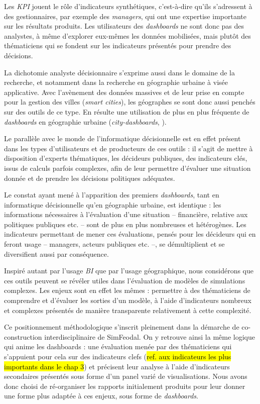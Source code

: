 	Les \textit{KPI} jouent le rôle d'indicateurs synthétiques, c'est-à-dire qu'ils s'adressent à des gestionnaires, par exemple des \textit{managers}, qui ont une expertise importante sur les résultats produits.
	Les utilisateurs des \textit{dashboards} ne sont donc pas des analystes, à même d'explorer eux-mêmes les données mobilisées, mais plutôt des thématiciens qui se fondent sur les indicateurs présentés pour prendre des décisions.

	La dichotomie \og analyste décisionnaire\fg{} s'exprime aussi dans le domaine de la recherche, et notamment dans la recherche en géographie urbaine à visée applicative.
	Avec l'avènement des données massives et de leur prise en compte pour la gestion des villes (\textit{smart cities}), les géographes se sont donc aussi penchés sur des outils de ce type.
	En résulte une utilisation de plus en plus fréquente de \textit{dashboards} en géographie urbaine (\og \textit{city-dashboards}\fg{}, \cite{roumpani_creating_2013, kitchin_knowing_2015, batty_perspective_2015}).

	Le parallèle avec le monde de l'informatique décisionnelle est en effet présent dans les types d'utilisateurs et de producteurs de ces outils : il s'agit de mettre à disposition d'experts thématiques, les décideurs publiques, des indicateurs clés, issus de calculs parfois complexes, afin de leur permettre d'évaluer une situation donnée et de prendre les décisions politiques adéquates.

	Le constat ayant mené à l'apparition des premiers \textit{dashboards}, tant en informatique décisionnelle qu'en géographie urbaine, est identique : les informations nécessaires à l'évaluation d'une situation -- financière, relative aux politiques publiques etc. -- sont de plus en plus nombreuses et hétérogènes.
	Les indicateurs permettant de mener ces évaluations, pensés pour les décideurs qui en feront usage -- managers, acteurs publiques etc. --, se démultiplient et se diversifient aussi par conséquence.

	Inspiré autant par l'usage \textit{BI} que par l'usage géographique, nous considérons que ces outils peuvent se révéler utiles dans l'évaluation de modèles de simulations complexes.
	Les enjeux sont en effet les mêmes : permettre à des thématiciens de comprendre et d'évaluer les sorties d'un modèle, à l'aide d'indicateurs nombreux et complexes présentés de manière transparente relativement à cette complexité.

	Ce positionnement méthodologique s'inscrit pleinement dans la démarche de co-construction interdisciplinaire de SimFeodal.
	On y retrouve ainsi la même logique qui anime les dashboards : une évaluation menée par des thématiciens qui s'appuient pour cela sur des indicateurs clefs (\hl{ref. aux indicateurs les plus importants dans le chap 3}) et précisent leur analyse à l'aide d'indicateurs secondaires présentés sous forme d'un panel varié de visualisations.
	Nous avons donc choisi de ré-organiser les rapports initialement produits pour leur donner une forme plus adaptée à ces enjeux, sous forme de \textit{dashboards}.

